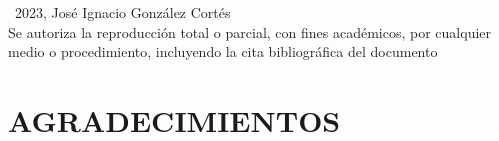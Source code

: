 \documentclass[spanish, a4paper, 12pt, openany,final]{book}
\begin{document}
\thispagestyle{empty}
\mbox{}                         %
\vfill                          %
\textcopyright\ 2023, José Ignacio González Cortés \\ %
Se autoriza la reproducción total o parcial, con fines académicos, por cualquier medio o procedimiento, incluyendo la cita bibliográfica del documento
\vspace{1cm}    %
\restoregeometry %








\thispagestyle{empty}
\mbox{}
\vfill
\hfill {}

\restoregeometry









\newpage
{}  %
\section*{AGRADECIMIENTOS}                       %
\end{document}
